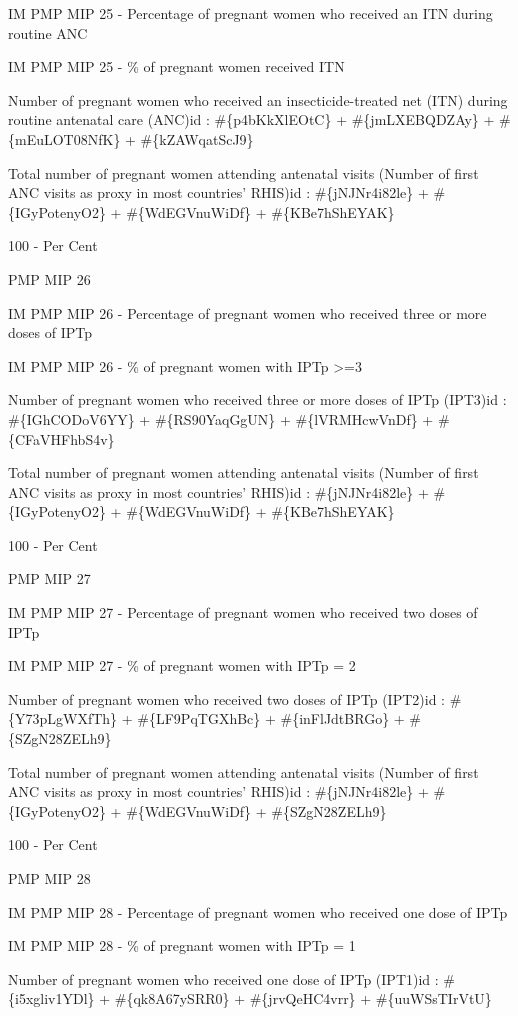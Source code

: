 \documentclass[]{book}
\begin{document}
IM PMP MIP 25 - Percentage of pregnant women who received an ITN during routine ANC

IM PMP MIP 25 - \% of pregnant women received ITN

Number of pregnant women who received an insecticide-treated net (ITN) during routine antenatal care (ANC)id : \#\{p4bKkXlEOtC\} + \#\{jmLXEBQDZAy\} + \#\{mEuLOT08NfK\} + \#\{kZAWqatScJ9\}

Total number of pregnant women attending antenatal visits (Number of first ANC visits as proxy in most countries' RHIS)id : \#\{jNJNr4i82le\} + \#\{IGyPotenyO2\} + \#\{WdEGVnuWiDf\} + \#\{KBe7hShEYAK\}

100 - Per Cent

PMP MIP 26

IM PMP MIP 26 - Percentage of pregnant women who received three or more doses of IPTp

IM PMP MIP 26 - \% of pregnant women with IPTp \textgreater{}=3

Number of pregnant women who received three or more doses of IPTp (IPT3)id : \#\{IGhCODoV6YY\} + \#\{RS90YaqGgUN\} + \#\{lVRMHcwVnDf\} + \#\{CFaVHFhbS4v\}

Total number of pregnant women attending antenatal visits (Number of first ANC visits as proxy in most countries' RHIS)id : \#\{jNJNr4i82le\} + \#\{IGyPotenyO2\} + \#\{WdEGVnuWiDf\} + \#\{KBe7hShEYAK\}

100 - Per Cent

PMP MIP 27

IM PMP MIP 27 - Percentage of pregnant women who received two doses of IPTp

IM PMP MIP 27 - \% of pregnant women with IPTp = 2

Number of pregnant women who received two doses of IPTp (IPT2)id : \#\{Y73pLgWXfTh\} + \#\{LF9PqTGXhBc\} + \#\{inFlJdtBRGo\} + \#\{SZgN28ZELh9\}

Total number of pregnant women attending antenatal visits (Number of first ANC visits as proxy in most countries' RHIS)id : \#\{jNJNr4i82le\} + \#\{IGyPotenyO2\} + \#\{WdEGVnuWiDf\} + \#\{SZgN28ZELh9\}

100 - Per Cent

PMP MIP 28

IM PMP MIP 28 - Percentage of pregnant women who received one dose of IPTp

IM PMP MIP 28 - \% of pregnant women with IPTp = 1

Number of pregnant women who received one dose of IPTp (IPT1)id : \#\{i5xgliv1YDl\} + \#\{qk8A67ySRR0\} + \#\{jrvQeHC4vrr\} + \#\{uuWSsTIrVtU\}
\end{document}
